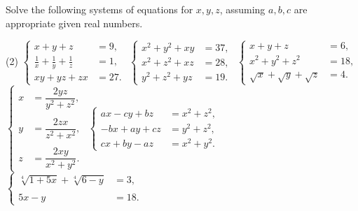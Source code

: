 \begin{tcolorbox}
    \begin{question}
        Solve the following systems of equations for $x,y,z$, assuming $a,b,c$ are appropriate given real numbers.
        \begin{tasks}(2)
            \task $\begin{cases}
                x+y+z &= 9,\\ \displaystyle \frac{1}{x} + \frac{1}{y} + \frac{1}{z} &= 1,\\ xy+yz+zx &= 27.
            \end{cases}$
            \task $\begin{cases}
                x^2+y^2+xy &= 37,\\ x^2+z^2+xz &= 28,\\ y^2+z^2+yz &= 19.
            \end{cases}$
            \task $\begin{cases}
                x+y+z &= 6,\\ x^2+y^2+z^2 &= 18,\\ \sqrt{x}+\sqrt{y}+\sqrt{z} &= 4.
            \end{cases}$
            \task $\begin{cases}
                \displaystyle x &= \dfrac{2yz}{y^2+z^2},\\ \\ \displaystyle y&= \dfrac{2zx}{z^2+x^2},\\ \\ \displaystyle z &= \dfrac{2xy}{x^2+y^2}.
            \end{cases}$
            \task $\begin{cases}
                ax-cy+bz &= x^2+z^2, \\ -bx+ay+cz &= y^2+z^2,\\ cx + by - az &= x^2+y^2.
            \end{cases}$
            \task $\begin{cases}
            \sqrt[4]{1+5x}+\sqrt[4]{6-y} &= 3,\\ \\  5x-y &= 18.
        \end{cases}$
        \end{tasks}
    \end{question}
\end{tcolorbox}

